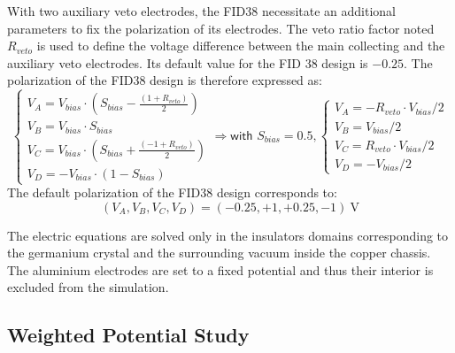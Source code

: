 
With two auxiliary veto electrodes, the FID38 necessitate an additional parameters to fix the polarization of its electrodes. The veto ratio factor noted $R_{veto}$ is used to define the voltage difference between the main collecting and the auxiliary veto electrodes. Its default value for the FID 38 design is $-0.25$. The polarization of the FID38 design is therefore expressed as:
\begin{equation}
\label{eq:fid-polarization}
\begin{cases}
\displaystyle 
V_A = V_{bias} \cdot \left( S_{bias} - \frac{\left( 1 + R_{veto}\right)}{2}\right)
\\
\displaystyle
V_B = V_{bias} \cdot S_{bias}
\\
\displaystyle
V_C = V_{bias} \cdot \left( S_{bias} + \frac{\left( -1 + R_{veto}\right)}{2}\right)
\\
\displaystyle
V_D = - V_{bias} \cdot (1 - S_{bias})
\end{cases}
\Rightarrow
\textsf{with } S_{bias} = 0.5,
\begin{cases}
\displaystyle 
V_A = - R_{veto} \cdot V_{bias} /2
\\
\displaystyle
V_B = V_{bias} /2 
\\
\displaystyle
V_C = R_{veto} \cdot V_{bias} /2
\\
\displaystyle
V_D = -  V_{bias}/2
\end{cases}
\end{equation}
The default polarization of the FID38 design corresponds to:
\begin{equation}
\label{eq:fid38-polarization-default}
\left( V_A, V_B, V_C, V_D \right) = (-0.25, +1, +0.25, -1) \ \si{\volt}
\end{equation}


The electric equations are solved only in the insulators domains corresponding to the germanium crystal and the surrounding vacuum inside the copper chassis. The aluminium electrodes are set to a fixed potential and thus their interior is excluded from the simulation. 


\subsection{Weighted Potential Study}
\label{par:weighting-potential}

